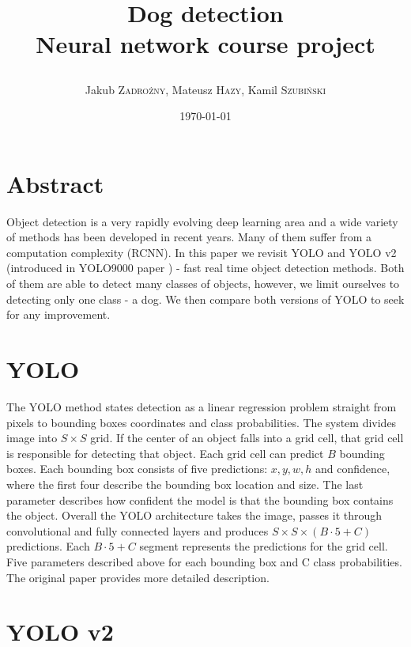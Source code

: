 \documentclass{article}
\title
{
	\LARGE\textbf{Dog detection} \\ 
	Neural network course project \\
	\author
	{ 
		Jakub \textsc{Zadrożny}, 
		Mateusz \textsc{Hazy},
		Kamil \textsc{Szubiński}
	}
}
\date{\today}
\begin{document}
\maketitle

\section*{Abstract}

Object detection is a very rapidly evolving deep learning area and a wide variety of methods has been developed in recent years. Many of them suffer from a computation complexity (RCNN). In this paper we revisit YOLO \cite{yolo} and YOLO v2 (introduced in YOLO9000 paper \cite{yolo9000}) - fast real time object detection methods. Both of them are able to detect many classes of objects, however, we limit ourselves to detecting only one class - a dog. We then compare both versions of YOLO to seek for any improvement.

\section*{YOLO}

The YOLO method states detection as a linear regression problem straight from pixels to bounding boxes coordinates and class probabilities. The system divides image into $ S \times S $ grid. If the center of an object falls into a grid cell, that grid cell is responsible for detecting that object. Each grid cell can predict $B$ bounding boxes. Each bounding box consists of five predictions: $x, y, w, h$ and confidence, where the first four describe the bounding box location and size. The last parameter describes how confident the model is that the bounding box contains the object. Overall the YOLO architecture takes the image, passes it through convolutional and fully connected layers and produces $S \times S \times (B \cdot  5 + C)$ predictions. Each $B \cdot 5 + C$ segment represents the predictions for the grid cell. Five parameters described above for each bounding box and C class probabilities. The original paper \cite{yolo} provides more detailed description.

\section*{YOLO v2}
\end{document}
